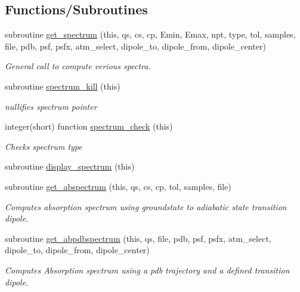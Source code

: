 \subsection*{Functions/\+Subroutines}
\begin{DoxyCompactItemize}
\item 
subroutine \hyperlink{namespacespectrometer__class_a068171434fa75613677e6357291df1fe}{get\+\_\+spectrum} (this, qs, cs, cp, Emin, Emax, npt, type, tol, samples, file, pdb, psf, psfx, atm\+\_\+select, dipole\+\_\+to, dipole\+\_\+from, dipole\+\_\+center)
\begin{DoxyCompactList}\small\item\em General call to compute verious spectra. \end{DoxyCompactList}\item 
subroutine \hyperlink{namespacespectrometer__class_aabaa46560b8ea49cd16b6c11a8a2fe65}{spectrum\+\_\+kill} (this)
\begin{DoxyCompactList}\small\item\em nullifies spectrum pointer \end{DoxyCompactList}\item 
integer(short) function \hyperlink{namespacespectrometer__class_a94382eb7e533e6a74dd79200ca0e38ed}{spectrum\+\_\+check} (this)
\begin{DoxyCompactList}\small\item\em Checks spectrum type \end{DoxyCompactList}\item 
subroutine \hyperlink{namespacespectrometer__class_a3f9fc6096d581c5a7094174b47898d10}{display\+\_\+spectrum} (this)
\item 
subroutine \hyperlink{namespacespectrometer__class_ad2c4936524c8702e1c4e53a54a043f31}{get\+\_\+abspectrum} (this, qs, cs, cp, tol, samples, file)
\begin{DoxyCompactList}\small\item\em Computes absorption spectrum using groundstate to adiabatic state transition dipole. \end{DoxyCompactList}\item 
subroutine \hyperlink{namespacespectrometer__class_af1fc802879075c7e5e42ef4baac69445}{get\+\_\+abpdbspectrum} (this, qs, file, pdb, psf, psfx, atm\+\_\+select, dipole\+\_\+to, dipole\+\_\+from, dipole\+\_\+center)
\begin{DoxyCompactList}\small\item\em Computes Absorption spectrum using a pdb trajectory and a defined transition dipole. \end{DoxyCompactList}\end{DoxyCompactItemize}
